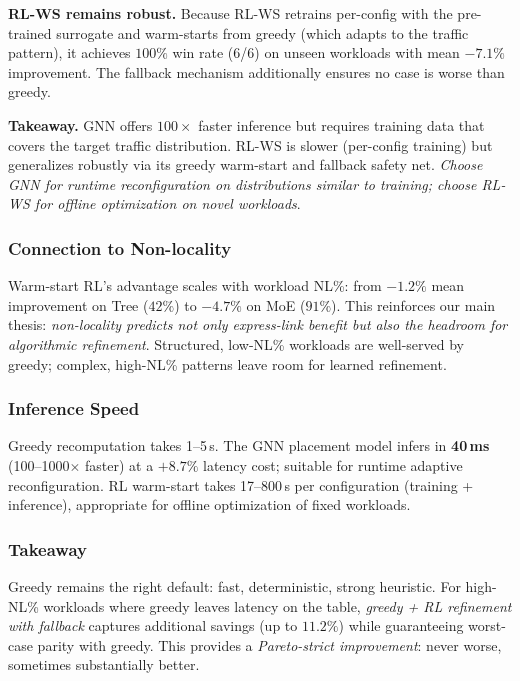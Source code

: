 \noindent\textbf{RL-WS remains robust.} Because RL-WS retrains per-config with
the pre-trained surrogate and warm-starts from greedy (which adapts to the
traffic pattern), it achieves $100\%$ win rate (6/6) on unseen workloads with
mean $-7.1\%$ improvement. The fallback mechanism additionally ensures no
case is worse than greedy.

\noindent\textbf{Takeaway.} GNN offers $100\times$ faster inference but requires
training data that covers the target traffic distribution. RL-WS is slower
(per-config training) but generalizes robustly via its greedy warm-start and
fallback safety net. \emph{Choose GNN for runtime reconfiguration on
distributions similar to training; choose RL-WS for offline optimization on
novel workloads}.

\subsubsection{Connection to Non-locality}

Warm-start RL's advantage scales with workload NL\%: from $-1.2\%$ mean
improvement on Tree ($42\%$) to $-4.7\%$ on MoE ($91\%$). This reinforces
our main thesis: \emph{non-locality predicts not only express-link benefit
but also the headroom for algorithmic refinement}. Structured, low-NL\%
workloads are well-served by greedy; complex, high-NL\% patterns leave room
for learned refinement.

\subsubsection{Inference Speed}

Greedy recomputation takes 1--5\,s. The GNN placement model infers in
\textbf{40\,ms} (100--1000$\times$ faster) at a $+8.7\%$ latency cost;
suitable for runtime adaptive reconfiguration. RL warm-start takes 17--800\,s
per configuration (training + inference), appropriate for offline
optimization of fixed workloads.

\subsubsection{Takeaway}

Greedy remains the right default: fast, deterministic, strong heuristic. For
high-NL\% workloads where greedy leaves latency on the table, \emph{greedy +
RL refinement with fallback} captures additional savings (up to $11.2\%$)
while guaranteeing worst-case parity with greedy. This provides a
\emph{Pareto-strict improvement}: never worse, sometimes substantially better.

